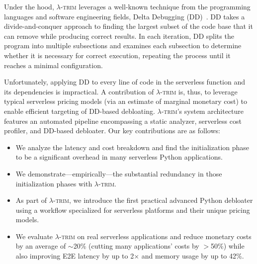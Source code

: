 \documentclass[sigplan,screen]{acmart}
\newenvironment{vinlist}
{\begin{itemize}[leftmargin=1.5em]
  \setlength{\itemsep}{0pt}
  \setlength{\labelwidth}{0.75em}
\setlength{\parsep}{0pt}
\setlength{\topsep}{0pt}
  \setlength{\partopsep}{0pt}
  }
{\end{itemize}}
\newcommand{\sys}{\textsc{\ensuremath{\lambda}-trim}\xspace}
\begin{document}
 







Under the hood, \sys leverages a well-known technique from the programming languages and software engineering fields, Delta Debugging (DD)~\cite{delta2002}.
DD takes a divide-and-conquer approach to finding the largest subset of the code base that it can remove while producing correct results.
In each iteration, DD splits the program into multiple subsections and examines each subsection to determine whether it is necessary for correct execution, repeating the process until it reaches a minimal configuration.


Unfortunately, applying DD to every line of code in the serverless function and its dependencies is impractical.
A contribution of \sys is, thus, to leverage typical serverless pricing models (via an estimate of marginal monetary cost) to enable efficient targeting of DD-based debloating.
\sys's system architecture features an automated pipeline encompassing a static analyzer, serverless cost profiler, and DD-based debloater.
Our key contributions are as follows:


































\begin{vinlist}
    \item We analyze the latency and cost breakdown and find the initialization phase to be a significant overhead in many serverless Python applications.
\item We demonstrate---empirically---the substantial redundancy in those initialization phases with \sys.
    \item As part of \sys, we introduce the first practical advanced Python debloater using
    a workflow specialized for serverless platforms and their unique pricing models.
\item We evaluate \sys on real serverless applications and reduce monetary costs by an average of $\sim$20\% (cutting many applications' costs by $>$50\%) while also improving E2E latency by up to 2$\times$ and memory usage by up to 42\%.
\end{vinlist}
\vspace{-6pt}
\end{document}
